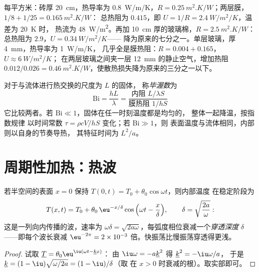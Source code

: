 \begin{example}[墙与窗]\label{ex:b2:heat-conduction:wall}
每平方米：砖厚 \qty{20}{cm}，热导率为 \qty{0.8}{W/m/K}，$R =
\qty{0.25}{m^2.K/W}$；两层膜，$1/8 + 1/25 = \qty{0.165}{m^2.K/W}$：
总热阻为 $0.415$，即 $U = 1/R = \qty{2.4}{W/m^2/K}$，温差为 \qty{20}{K} 时，
热流为 \qty{48}{W/m^2}。再加 \qty{10}{cm} 厚的玻璃棉，$R =
\qty{2.5}{m^2.K/W}$：总热阻为 $2.9$，$U = \qty{0.34}{W/m^2/K}$——
降为原来的七分之一。单层玻璃，厚 \qty{4}{mm}，热导率为 \qty{1}{W/m/K}，
几乎全是膜热阻：$R = 0.004 + 0.165$，$U \approx \qty{6}{W/m^2/K}$；
在两层玻璃之间夹一层 \qty{12}{mm} 的静止空气，增加热阻 $0.012/0.026 =
\qty{0.46}{m^2.K/W}$，使散热损失降为原来的三分之一以下。
\end{example}

\begin{definition}[毕渥数]\label{def:b2:heat-conduction:biot}
对于与流体进行热交换的尺度为 $L$ 的固体，
称\emph{毕渥数}为
\[
\mathrm{Bi} = \frac{hL}{\lambda} = \frac{\text{内阻 } L/\lambda S}{\text{膜热阻 } 1/hS}
\]
它比较两者。若 $\mathrm{Bi} \ll 1$，固体在任一时刻温度都是均匀的，
整体一起降温，按指数规律
以时间常数 $\tau = \rho c V/hS$ 变化；若 $\mathrm{Bi} \gg 1$，则
表面温度与流体相同，内部则以自身的节奏导热，
其特征时间为 $L^2/a$。
\end{definition}

\section{周期性加热：热波}

\begin{proposition}[半空间中的热波]\label{prop:b2:heat-conduction:wave}
若半空间的表面 $x = 0$ 保持 $T(0,t) = T_0 +
\theta_0\cos\omega t$，则内部温度
在稳定阶段为
\[
T(x,t) = T_0 + \theta_0\,\eu^{-x/\delta}\cos\Big(\omega t - \frac{x}{\delta}\Big),
\qquad \delta = \sqrt{\frac{2a}{\omega}} :
\]
这是一列向内传播的波，速率为 $\omega\delta =
\sqrt{2a\omega}$，每弧度相位衰减一个\emph{穿透深度} $\delta$
——即每个波长衰减 $\eu^{-2\pi} = 2 \times 10^{-3}$
倍。快振荡比慢振荡穿透得更浅。
\end{proposition}

\begin{proof}
试取 $\underline T = \theta_0\eu^{\iu(\omega t - \underline k x)}$：
由 $\iu\omega = -a\underline k^2$ 得 $\underline k^2 = -\iu\omega/a$，
于是 $\underline k = (1 - \iu)\sqrt{\omega/2a} = (1 - \iu)/\delta$（取
在 $x > 0$ 时衰减的根）。取实部即可。
\end{proof}

